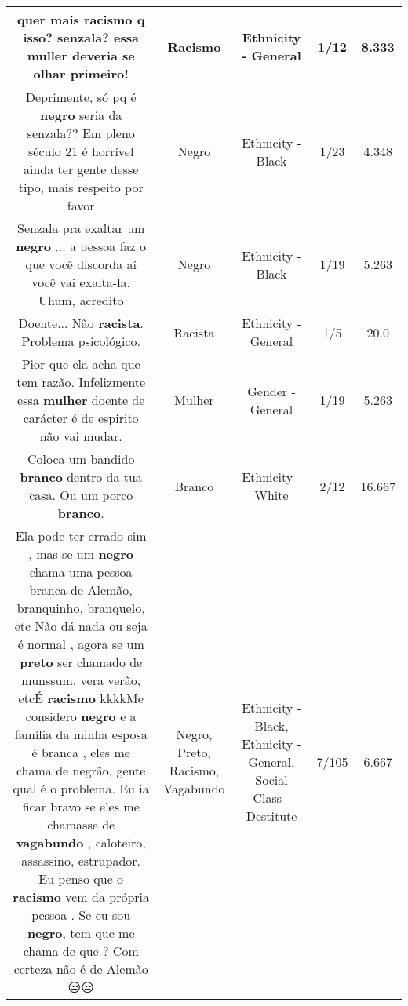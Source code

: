 \documentclass[11pt]{article}
\newlength\mylength
\begin{document}
\begin{center}
\begin{longtable}{|C{.65\mylength}|C{.30\mylength}|C{.12\mylength}|C{.12\mylength}|C{.12\mylength}|}
  \small quer mais \textbf{racismo} q isso? senzala? essa muller deveria se olhar primeiro!\normalsize   & Racismo & Ethnicity - General & 1/12 & 8.333 \\  \hline
  \small Deprimente, só pq é \textbf{negro} seria da senzala?? Em pleno século 21 é horrível ainda ter gente desse tipo, mais respeito por favor\normalsize   & Negro & Ethnicity - Black & 1/23 & 4.348 \\  \hline
  \small Senzala pra exaltar um \textbf{negro} ... a pessoa faz o que você discorda aí você vai exalta-la. Uhum, acredito\normalsize   & Negro & Ethnicity - Black & 1/19 & 5.263 \\  \hline
  \small Doente... Não \textbf{racista}. Problema psicológico.\normalsize   & Racista & Ethnicity - General & 1/5 & 20.0 \\  \hline
  \small Pior que ela acha que tem razão. Infelizmente essa \textbf{mulher} doente de carácter é de espirito não vai mudar.\normalsize   & Mulher & Gender - General & 1/19 & 5.263 \\  \hline
  \small Coloca um bandido  \textbf{branco} dentro da tua casa.  Ou um porco \textbf{branco}.\normalsize   & Branco & Ethnicity - White & 2/12 & 16.667 \\  \hline
  \small Ela pode ter errado sim , mas se um \textbf{negro} chama uma pessoa branca de Alemão, branquinho, branquelo, etc Não dá nada ou seja é normal , agora se um \textbf{preto} ser chamado de munssum, vera verão, etcÉ \textbf{racismo} kkkkMe considero \textbf{negro} e a família da minha esposa é branca , eles me chama de negrão, gente qual é o problema. Eu ia ficar bravo se eles me chamasse de \textbf{vagabundo} , caloteiro, assassino, estrupador. Eu penso que o \textbf{racismo} vem da própria pessoa . Se eu sou \textbf{negro}, tem que me chama de que ? Com certeza não é de Alemão 😒😒\normalsize   & Negro, Preto, Racismo, Vagabundo & Ethnicity - Black, Ethnicity - General, Social Class - Destitute & 7/105 & 6.667 \\  \hline

\end{longtable}
\end{center}
\end{document}
